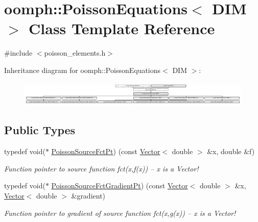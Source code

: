 \hypertarget{classoomph_1_1PoissonEquations}{}\section{oomph\+:\+:Poisson\+Equations$<$ D\+IM $>$ Class Template Reference}
\label{classoomph_1_1PoissonEquations}


{\ttfamily \#include $<$poisson\+\_\+elements.\+h$>$}

Inheritance diagram for oomph\+:\+:Poisson\+Equations$<$ D\+IM $>$\+:\begin{figure}[H]
\begin{center}
\leavevmode
\includegraphics[height=1.190476cm]{classoomph_1_1PoissonEquations}
\end{center}
\end{figure}
\subsection*{Public Types}
\begin{DoxyCompactItemize}
\item 
typedef void($\ast$ \hyperlink{classoomph_1_1PoissonEquations_a1e3a857c1f506c99d437fb932a24c828}{Poisson\+Source\+Fct\+Pt}) (const \hyperlink{classoomph_1_1Vector}{Vector}$<$ double $>$ \&x, double \&f)
\begin{DoxyCompactList}\small\item\em Function pointer to source function fct(x,f(x)) -- x is a Vector! \end{DoxyCompactList}\item 
typedef void($\ast$ \hyperlink{classoomph_1_1PoissonEquations_a6182c46eb07d6219d6f939f0962724c4}{Poisson\+Source\+Fct\+Gradient\+Pt}) (const \hyperlink{classoomph_1_1Vector}{Vector}$<$ double $>$ \&x, \hyperlink{classoomph_1_1Vector}{Vector}$<$ double $>$ \&gradient)
\begin{DoxyCompactList}\small\item\em Function pointer to gradient of source function fct(x,g(x)) -- x is a Vector! \end{DoxyCompactList}\end{DoxyCompactItemize}
